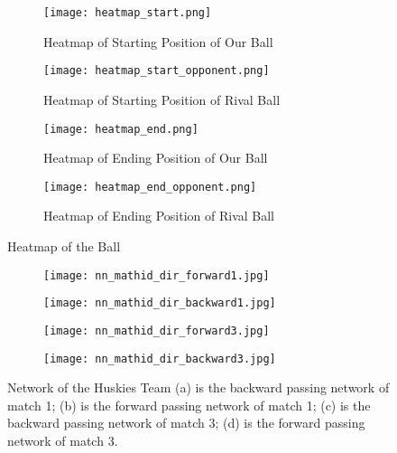 \documentclass[12pt]{mcmthesis}
\begin{document}
\begin{figure}[h]
	\centering
	\begin{subfigure}[b]{0.23\textwidth}
		\texttt{[image: heatmap\_start.png]}
		\caption{Heatmap of Starting Position of Our Ball}
	\end{subfigure}
	\begin{subfigure}[b]{0.23\textwidth}
		\texttt{[image: heatmap\_start\_opponent.png]}
		\caption{Heatmap of Starting Position of Rival Ball}
	\end{subfigure}
	\begin{subfigure}[b]{0.23\textwidth}
		\texttt{[image: heatmap\_end.png]}
		\caption{Heatmap of Ending Position of Our Ball}
	\end{subfigure}
	\begin{subfigure}[b]{0.23\textwidth}
		\texttt{[image: heatmap\_end\_opponent.png]}
		\caption{Heatmap of Ending Position of Rival Ball}
	\end{subfigure}
	\caption{Heatmap of the Ball}
	\label{fig:heatmap}
\end{figure}


\begin{figure}[h]
	\centering
	\begin{subfigure}[b]{0.4\textwidth}
		\texttt{[image: nn\_mathid\_dir\_forward1.jpg]}
		\caption{}
	\end{subfigure}
	\begin{subfigure}[b]{0.4\textwidth}
		\texttt{[image: nn\_mathid\_dir\_backward1.jpg]}
		\caption{}
	\end{subfigure}
	\begin{subfigure}[b]{0.4\textwidth}
		\texttt{[image: nn\_mathid\_dir\_forward3.jpg]}
		\caption{}
	\end{subfigure}
	\begin{subfigure}[b]{0.4\textwidth}
		\texttt{[image: nn\_mathid\_dir\_backward3.jpg]}
		\caption{}
	\end{subfigure}
	\caption{Network of the Huskies Team (a) is the backward passing network of match 1; (b) is the forward passing network of match 1; %
(c) is the backward passing network of match 3; (d) is the forward passing network of match 3.}
	\label{fig:network}
\end{figure}
\end{document}
